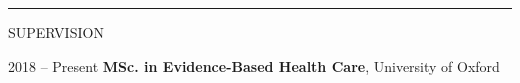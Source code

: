 \documentclass[10pt,a4paper]{article}
\begin{document}
\noindent\rule{\textwidth}{0.4pt}
\begin{cvlist}{SUPERVISION}
	
	\item[2018 -- Present]
	\textbf{MSc. in Evidence-Based Health Care}, University of Oxford
	
\end{cvlist}


\begin{comment}
\noindent\rule{\textwidth}{0.4pt}
\begin{cvlist}{EMPLOYMENT}
	
	\item[2015 -- Present]
	\textbf{Nuffield Dept Primary Care Health Sciences}, University of Oxford \\
	\textit{Statistician}
	
	\item[2011 -- 2012]
	\textbf{Phoenix Property Services}, Gloucester \\
	\textit{Owner}
	
	\item[2009 -- 2010]
	\textbf{Staples}, Gloucester \\
	\textit{Inventory Team Leader}
	
	\item[2008 -- 2009]
	\textbf{Phil \& Ben\ldots The Bathroom Men}, Tewkesbury \\
	\textit{Co-Owner}
	
\end{cvlist}
\end{comment}
\end{document}
